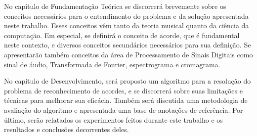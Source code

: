     No capítulo de Fundamentação Teórica se discorrerá brevemente sobre os conceitos necessários para o entendimento do problema e da solução apresentada neste trabalho. Esses conceitos vêm tanto da teoria musical quanto da ciência da computação. Em especial, se definirá o conceito de acorde, que é fundamental neste contexto, e diversos conceitos secundários necessários para sua definição. Se apresentarão também conceitos da área de Processamento de Sinais Digitais como sinal de áudio, Transformada de Fourier, espectrograma e cromagrama.
    
    No capítulo de Desenvolvimento, será proposto um algoritmo para a resolução do problema de reconhecimento de acordes, e se discorrerá sobre suas limitações e técnicas para melhorar sua eficácia. Também será discutida uma metodologia de avaliação do algoritmo e apresentada uma base de anotações de referência. Por último, serão relatados os experimentos feitos durante este trabalho e os resultados e conclusões decorrentes deles.
    